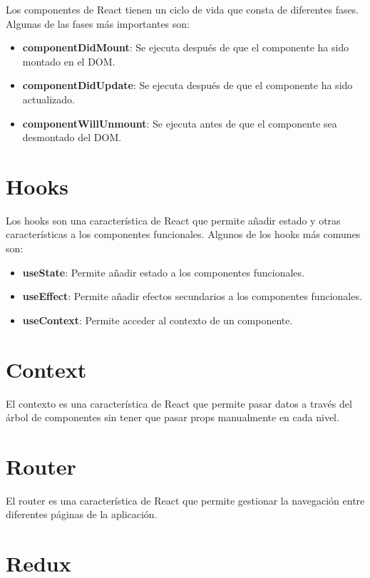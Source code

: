 \documentclass[
  a4paper,
  DIV=11,
  numbers=noendperiod,
  onepage,
  openany]{scrreprt}
\providecommand{\tightlist}{%
  \setlength{\itemsep}{0pt}\setlength{\parskip}{0pt}}\usepackage{longtable,booktabs,array}
\begin{document}
Los componentes de React tienen un ciclo de vida que consta de
diferentes fases. Algunas de las fases más importantes son:

\begin{itemize}
\tightlist
\item
  \textbf{componentDidMount}: Se ejecuta después de que el componente ha
  sido montado en el DOM.
\item
  \textbf{componentDidUpdate}: Se ejecuta después de que el componente
  ha sido actualizado.
\item
  \textbf{componentWillUnmount}: Se ejecuta antes de que el componente
  sea desmontado del DOM.
\end{itemize}

\section{Hooks}\label{hooks}

Los hooks son una característica de React que permite añadir estado y
otras características a los componentes funcionales. Algunos de los
hooks más comunes son:

\begin{itemize}
\tightlist
\item
  \textbf{useState}: Permite añadir estado a los componentes
  funcionales.
\item
  \textbf{useEffect}: Permite añadir efectos secundarios a los
  componentes funcionales.
\item
  \textbf{useContext}: Permite acceder al contexto de un componente.
\end{itemize}

\section{Context}\label{context}

El contexto es una característica de React que permite pasar datos a
través del árbol de componentes sin tener que pasar props manualmente en
cada nivel.

\section{Router}\label{router}

El router es una característica de React que permite gestionar la
navegación entre diferentes páginas de la aplicación.

\section{Redux}\label{redux}
\end{document}
